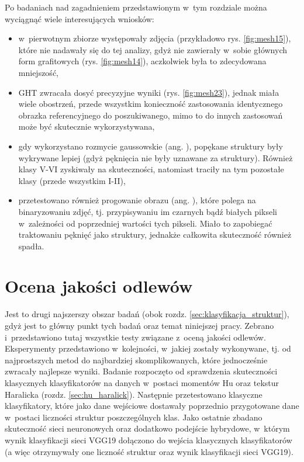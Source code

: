 Po badaniach nad zagadnieniem przedstawionym w~tym rozdziale można wyciągnąć wiele interesujących wniosków:
\begin{itemize}
	\item w~pierwotnym zbiorze występowały zdjęcia (przykładowo rys. \ref{fig:mesh15}), które nie nadawały się do tej analizy, gdyż nie zawierały w~sobie głównych form grafitowych (rys. \ref{fig:mesh14}), aczkolwiek była to zdecydowana mniejszość,
	\item GHT zwracała dosyć precyzyjne wyniki (rys. \ref{fig:mesh23}), jednak miała wiele obostrzeń, przede wszystkim konieczność zastosowania identycznego obrazka referencyjnego do poszukiwanego, mimo to do innych zastosowań może być skutecznie wykorzystywana,
	\item gdy wykorzystano rozmycie gaussowskie (ang. ), popękane struktury były wykrywane lepiej (gdyż pęknięcia nie były uznawane za struktury). Również klasy V-VI zyskiwały na skuteczności, natomiast traciły na tym pozostałe klasy (przede wszystkim I-II),
	\item przetestowano również progowanie obrazu (ang. ), które polega na binaryzowaniu zdjęć, tj. przypisywaniu im czarnych bądź białych pikseli w~zależności od poprzedniej wartości tych pikseli. Miało to zapobiegać traktowaniu pęknięć jako struktury, jednakże całkowita skuteczność również spadła.
\end{itemize}

\section{Ocena jakości odlewów}
\label{Ocena jakości odlewów}

Jest to drugi najszerszy obszar badań (obok rozdz. \ref{sec:klasyfikacja_struktur}), gdyż jest to główny punkt tych badań oraz temat niniejszej pracy. Zebrano i~przedstawiono tutaj wszystkie testy związane z~oceną jakości odlewów. Eksperymenty przedstawiono w~kolejności, w~jakiej zostały wykonywane, tj. od najprostszych metod do najbardziej skomplikowanych, które jednocześnie zwracały najlepsze wyniki. Badanie rozpoczęto od sprawdzenia skuteczności klasycznych klasyfikatorów na danych w~postaci momentów Hu oraz tekstur Haralicka (rozdz. \ref{sec:hu_haralick}). Następnie przetestowano klasyczne klasyfikatory, które jako dane wejściowe dostawały poprzednio przygotowane dane w~postaci liczności struktur poszczególnych klas. Jako ostatnie zbadano skuteczność sieci neuronowych oraz dodatkowo podejście hybrydowe, w~którym wynik klasyfikacji sieci VGG19 dołączono do wejścia klasycznych klasyfikatorów (a więc otrzymywały one liczność struktur oraz wynik klasyfikacji sieci VGG19). 

